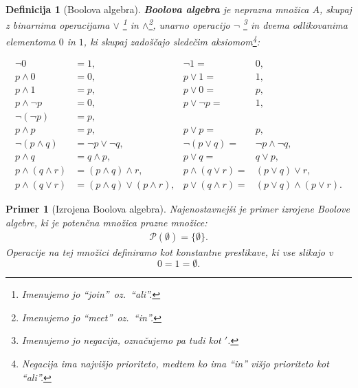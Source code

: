\documentclass{amsart}
\newtheorem{definicija}[izrek]{Definicija}
\newtheorem{primer}[izrek]{Primer}
\begin{document}
\begin{definicija}[Boolova algebra]
    {\bf Boolova algebra} je neprazna množica \(A\), skupaj z binarnima operacijama \(\vee\) \footnote{Imenujemo jo ``join''\ oz.\ 
    ``ali''.} in \(\wedge\)\footnote{Imenujemo jo ``meet''\ oz.\ ``in''.}, unarno operacijo \(\neg\)
    \footnote{Imenujemo jo negacija, označujemo pa tudi kot \('\).} in dvema odlikovanima 
    elementoma \(0\) in \(1\), ki skupaj zadoščajo sledečim aksiomom\footnote{Negacija ima najvišjo prioriteto, medtem ko ima ``in'' višjo prioriteto kot ``ali''.}:

    \begin{align}
        \label{eq0}
        \neg 0 &= 1, & \neg 1 =& 0,\\ \label{eq1}
        p \wedge 0 &= 0, & p \vee 1 =& 1,\\ \label{eq2}
        p \wedge 1 &= p, & p \vee 0 =& p,\\ \label{eq3}
        p \wedge \neg p &= 0, & p \vee \neg p =& 1,\\ \label{eq4}
         \neg (\neg p) &= p,\\ \label{eq5}
        p \wedge p &= p, & p \vee p =& p,\\ \label{eq6}
        \neg (p \wedge q) &= \neg p \vee \neg q, & \neg (p \vee q) =& \neg p \wedge \neg q,\\ \label{eq7}
        p \wedge q &= q \wedge p, & p \vee q =& q \vee p,\\ \label{eq8}
        p \wedge (q \wedge r) &= (p \wedge q) \wedge r, & p \wedge (q \vee r) =& (p \vee q) \vee r,\\ \label{eq9}
        p \wedge (q \vee r) &= (p \wedge q) \vee (p \wedge r), & p \vee (q \wedge r) =& (p \vee q) \wedge (p \vee r).
    \end{align}
    
\end{definicija}

\begin{primer}[Izrojena Boolova algebra]
    Najenostavnejši je primer izrojene Boolove algebre, ki je potenčna množica prazne množice:
    \begin{align*}
        \mathcal{P}\left(\emptyset\right) = \{\emptyset\}.
    \end{align*}
    Operacije na tej množici definiramo kot konstantne preslikave, ki vse slikajo v \[0 = 1 = \emptyset.\]
\end{primer}
\end{document}
